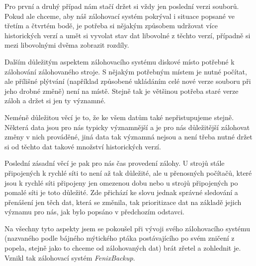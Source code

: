 Pro první a druhý případ nám stačí držet si vždy jen poslední verzi souborů.
Pokud ale chceme, aby náš zálohovací systém pokrýval i situace popsané ve třetím
a čtvrtém bodě, je potřeba si nějakým způsobem udržovat více historických verzí
a umět si vyvolat stav dat libovolné z těchto verzí, případně si mezi libovolnými
dvěma zobrazit rozdíly.

Dalším důležitým aspektem zálohovacího systému diskové místo potřebné k
zálohování zálohovaného stroje. S nějakým potřebným místem je nutné počítat, ale
přílišné plýtvání (například způsobené ukládáním celé nové verze souboru při
jeho drobné změně) není na místě. Stejně tak je většinou potřeba 
staré verze záloh a držet si jen ty významné.

Neméně důležitou věcí je to, že ke všem datům také nepřistupujeme stejně. Některá
data jsou pro nás typicky významnější a je pro nás důležitější zálohovat změny
v nich prováděné, jiná data tak významná nejsou a není třeba nutné držet si od
těchto dat takové množství historických verzí.

Poslední zásadní věcí je pak pro nás čas provedení zálohy. U strojů stále
připojených k rychlé síti to není až tak důležité, ale u přenosných počítačů,
které jsou k rychlé síti připojeny jen omezenou dobu nebo u strojů připojených
po pomalé síti je toto důležité. Zde přichází ke slovu jednak správné sledování
a přenášení jen těch dat, která se změnila, tak prioritizace dat na základě
jejich významu pro nás, jak bylo popsáno v předchozím odstavci.

Na všechny tyto aspekty jsem se pokoušel při vývoji svého zálohovacího systému
(nazvaného podle bájného mýtického ptáka postávajícího po svém zničení z popela,
stejně jako to chceme od zálohovaných dat) brát zřetel a zohlednit je. Vznikl
tak zálohovací systém {\it FenixBackup}.
